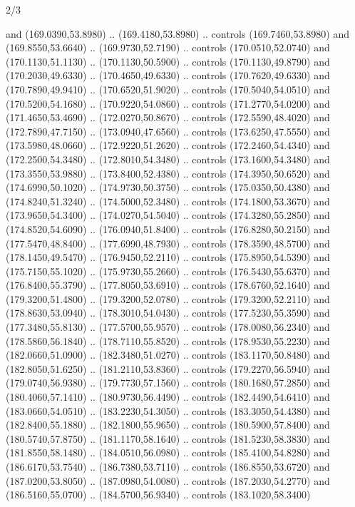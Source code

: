\begin{flagdescription}{2/3}
\begin{scope}[xshift=0.5\flaglength,yshift=0.5\flagwidth,scale=\stretchfactor]
\begin{scope}[scale=0.001645\flagwidth,yshift=65mm,xshift=-63mm]
\begin{scope}[y=0.80pt, x=0.80pt, yscale=-1,]
\begin{scope}[cm={{1.33333,0.0,0.0,1.33333,(0.0,1e-05)}}]
  and (169.0390,53.8980) .. (169.4180,53.8980) .. controls (169.7460,53.8980)
  and (169.8550,53.6640) .. (169.9730,52.7190) .. controls (170.0510,52.0740)
  and (170.1130,51.1130) .. (170.1130,50.5900) .. controls (170.1130,49.8790)
  and (170.2030,49.6330) .. (170.4650,49.6330) .. controls (170.7620,49.6330)
  and (170.7890,49.9410) .. (170.6520,51.9020) .. controls (170.5040,54.0510)
  and (170.5200,54.1680) .. (170.9220,54.0860) .. controls (171.2770,54.0200)
  and (171.4650,53.4690) .. (172.0270,50.8670) .. controls (172.5590,48.4020)
  and (172.7890,47.7150) .. (173.0940,47.6560) .. controls (173.6250,47.5550)
  and (173.5980,48.0660) .. (172.9220,51.2620) .. controls (172.2460,54.4340)
  and (172.2500,54.3480) .. (172.8010,54.3480) .. controls (173.1600,54.3480)
  and (173.3550,53.9880) .. (173.8400,52.4380) .. controls (174.3950,50.6520)
  and (174.6990,50.1020) .. (174.9730,50.3750) .. controls (175.0350,50.4380)
  and (174.8240,51.3240) .. (174.5000,52.3480) .. controls (174.1800,53.3670)
  and (173.9650,54.3400) .. (174.0270,54.5040) .. controls (174.3280,55.2850)
  and (174.8520,54.6090) .. (176.0940,51.8400) .. controls (176.8280,50.2150)
  and (177.5470,48.8400) .. (177.6990,48.7930) .. controls (178.3590,48.5700)
  and (178.1450,49.5470) .. (176.9450,52.2110) .. controls (175.8950,54.5390)
  and (175.7150,55.1020) .. (175.9730,55.2660) .. controls (176.5430,55.6370)
  and (176.8400,55.3790) .. (177.8050,53.6910) .. controls (178.6760,52.1640)
  and (179.3200,51.4800) .. (179.3200,52.0780) .. controls (179.3200,52.2110)
  and (178.8630,53.0940) .. (178.3010,54.0430) .. controls (177.5230,55.3590)
  and (177.3480,55.8130) .. (177.5700,55.9570) .. controls (178.0080,56.2340)
  and (178.5860,56.1840) .. (178.7110,55.8520) .. controls (178.9530,55.2230)
  and (182.0660,51.0900) .. (182.3480,51.0270) .. controls (183.1170,50.8480)
  and (182.8050,51.6250) .. (181.2110,53.8360) .. controls (179.2270,56.5940)
  and (179.0740,56.9380) .. (179.7730,57.1560) .. controls (180.1680,57.2850)
  and (180.4060,57.1410) .. (180.9730,56.4490) .. controls (182.4490,54.6410)
  and (183.0660,54.0510) .. (183.2230,54.3050) .. controls (183.3050,54.4380)
  and (182.8400,55.1880) .. (182.1800,55.9650) .. controls (180.5900,57.8400)
  and (180.5740,57.8750) .. (181.1170,58.1640) .. controls (181.5230,58.3830)
  and (181.8550,58.1480) .. (184.0510,56.0980) .. controls (185.4100,54.8280)
  and (186.6170,53.7540) .. (186.7380,53.7110) .. controls (186.8550,53.6720)
  and (187.0200,53.8050) .. (187.0980,54.0080) .. controls (187.2030,54.2770)
  and (186.5160,55.0700) .. (184.5700,56.9340) .. controls (183.1020,58.3400)

\end{scope}
\end{scope}
\end{scope}
\end{scope}
\end{flagdescription}
